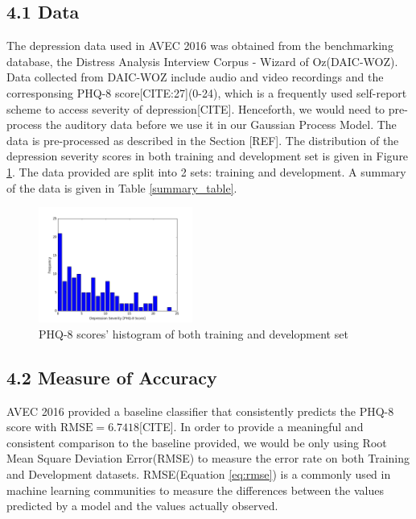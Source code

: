 \documentclass{article}
\begin{document}
	\subsection{4.1 Data}
	The depression data used in AVEC 2016 was obtained from the benchmarking database, the Distress Analysis Interview Corpus - Wizard of Oz(DAIC-WOZ). Data collected from DAIC-WOZ include audio and video recordings and the corresponsing PHQ-8 score[CITE:27](0-24), which is a frequently used self-report scheme to access severity of depression[CITE]. Henceforth, we would need to pre-process the auditory data before we use it in our Gaussian Process Model. The data is pre-processed as described in the Section [REF]. The distribution of the depression severity scores in both training and development set is given in Figure \ref{histogram_phq8}. The data provided are split into 2 sets: training and development. A summary of the data is given in Table \ref{summary_table}.
	\begin{figure}
  \includegraphics[width=0.45\textwidth]{histogram_phq8}
  \caption{PHQ-8 scores' histogram of both training and development set}
  \label{histogram_phq8}
 \end{figure}
 \subsection{4.2 Measure of Accuracy}
 AVEC 2016 provided a baseline classifier that consistently predicts the PHQ-8 score with $\text{RMSE}=6.7418$[CITE]. In order to provide a meaningful and consistent comparison to the baseline provided, we would be only using Root Mean Square Deviation Error(RMSE) to measure the error rate on both Training and Development datasets. RMSE(Equation \ref{eq:rmse}) is a commonly used in machine learning communities to measure the differences between the values predicted by a model and the values actually observed. 
\end{document}
